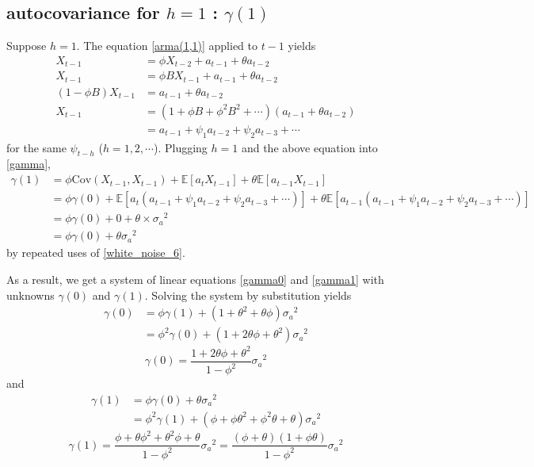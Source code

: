 \documentclass{article}
\newcommand\cov{\ensuremath{\text{Cov}}}
\newcommand\sa{\ensuremath{{\sigma_a}^2}}
\begin{document}
%
\subsection{autocovariance for \(h=1\) : \(\gamma(1)\)}\label{h1}
Suppose \(h=1\).
The equation \eqref{arma(1,1)} applied to \(t-1\) yields
\begin{align*}
X_{t-1}&=\phi X_{t-2}+a_{t-1}+\theta a_{t-2}\\
X_{t-1}&=\phi BX_{t-1}+a_{t-1}+\theta a_{t-2}\\
(1-\phi B)X_{t-1}&=a_{t-1}+\theta a_{t-2}\\
X_{t-1}&=(1+\phi B+\phi^2B^2+\cdots)(a_{t-1}+\theta a_{t-2})\\
&=a_{t-1}+\psi_1a_{t-2}+\psi_2a_{t-3}+\cdots
\end{align*}
for the same \(\psi_{t-h}\) (\(h=1,2,\cdots\)).
Plugging \(h=1\) and the above equation into \eqref{gamma},
\begin{equation}\label{gamma1}
\begin{aligned}
\gamma(1)
&=\phi\cov(X_{t-1},X_{t-1})+\mathbb E[a_tX_{t-1}]+\theta\mathbb E[a_{t-1}X_{t-1}]\\
&=\phi\gamma(0)+\mathbb E[a_t(a_{t-1}+\psi_1a_{t-2}+\psi_2a_{t-3}+\cdots)]+\theta\mathbb E[a_{t-1}(a_{t-1}+\psi_1a_{t-2}+\psi_2a_{t-3}+\cdots)]\\
&=\phi\gamma(0)+0+\theta\times\sa\\
&=\phi\gamma(0)+\theta\sa
\end{aligned}
\end{equation}
by repeated uses of \eqref{white_noise_6}.

As a result, we get a system of linear equations \eqref{gamma0} and \eqref{gamma1} with unknowns \(\gamma(0)\) and \(\gamma(1)\).
Solving the system by substitution yields
\begin{align*}
\gamma(0)
&=\phi\gamma(1)+(1+\theta^2+\theta\phi)\sa\\
&=\phi^2\gamma(0)+(1+2\theta\phi+\theta^2)\sa
\end{align*}
\begin{equation}\label{h0_}
\gamma(0)=\frac{1+2\theta\phi+\theta^2}{1-\phi^2}\sa
\end{equation}
and
\begin{align*}
\gamma(1)
&=\phi\gamma(0)+\theta\sa\\
&=\phi^2\gamma(1)+(\phi+\phi\theta^2+\phi^2\theta+\theta)\sa
\end{align*}
\begin{equation}\label{h1_}
\gamma(1)=\frac{\phi+\theta\phi^2+\theta^2\phi+\theta}{1-\phi^2}\sa=\frac{(\phi+\theta)(1+\phi\theta)}{1-\phi^2}\sa
\end{equation}
\end{document}
